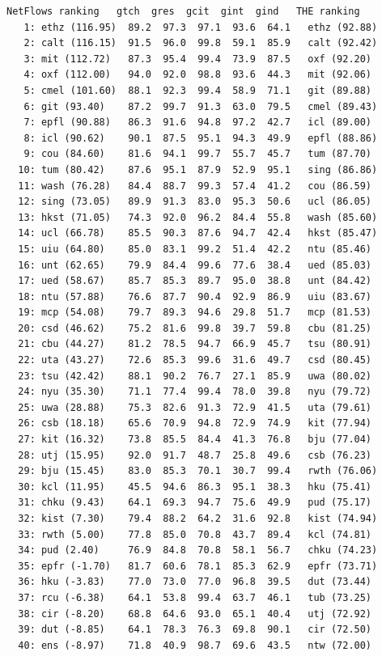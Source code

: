\begin{lstlisting}[caption={Comparing the robust \NetFlows ranking with the THE ranking},label=list:13.10]
  NetFlows ranking   gtch  gres  gcit  gint  gind   THE ranking
   1: ethz (116.95)  89.2  97.3  97.1  93.6  64.1   ethz (92.88)
   2: calt (116.15)  91.5  96.0  99.8  59.1  85.9   calt (92.42)
   3: mit (112.72)   87.3  95.4  99.4  73.9  87.5   oxf (92.20)
   4: oxf (112.00)   94.0  92.0  98.8  93.6  44.3   mit (92.06)
   5: cmel (101.60)  88.1  92.3  99.4  58.9  71.1   git (89.88)
   6: git (93.40)    87.2  99.7  91.3  63.0  79.5   cmel (89.43)
   7: epfl (90.88)   86.3  91.6  94.8  97.2  42.7   icl (89.00)
   8: icl (90.62)    90.1  87.5  95.1  94.3  49.9   epfl (88.86)
   9: cou (84.60)    81.6  94.1  99.7  55.7  45.7   tum (87.70)
  10: tum (80.42)    87.6  95.1  87.9  52.9  95.1   sing (86.86)
  11: wash (76.28)   84.4  88.7  99.3  57.4  41.2   cou (86.59)
  12: sing (73.05)   89.9  91.3  83.0  95.3  50.6   ucl (86.05)
  13: hkst (71.05)   74.3  92.0  96.2  84.4  55.8   wash (85.60)
  14: ucl (66.78)    85.5  90.3  87.6  94.7  42.4   hkst (85.47)
  15: uiu (64.80)    85.0  83.1  99.2  51.4  42.2   ntu (85.46)
  16: unt (62.65)    79.9  84.4  99.6  77.6  38.4   ued (85.03)
  17: ued (58.67)    85.7  85.3  89.7  95.0  38.8   unt (84.42)
  18: ntu (57.88)    76.6  87.7  90.4  92.9  86.9   uiu (83.67)
  19: mcp (54.08)    79.7  89.3  94.6  29.8  51.7   mcp (81.53)
  20: csd (46.62)    75.2  81.6  99.8  39.7  59.8   cbu (81.25)
  21: cbu (44.27)    81.2  78.5  94.7  66.9  45.7   tsu (80.91)
  22: uta (43.27)    72.6  85.3  99.6  31.6  49.7   csd (80.45)
  23: tsu (42.42)    88.1  90.2  76.7  27.1  85.9   uwa (80.02)
  24: nyu (35.30)    71.1  77.4  99.4  78.0  39.8   nyu (79.72)
  25: uwa (28.88)    75.3  82.6  91.3  72.9  41.5   uta (79.61)
  26: csb (18.18)    65.6  70.9  94.8  72.9  74.9   kit (77.94)
  27: kit (16.32)    73.8  85.5  84.4  41.3  76.8   bju (77.04)
  28: utj (15.95)    92.0  91.7  48.7  25.8  49.6   csb (76.23)
  29: bju (15.45)    83.0  85.3  70.1  30.7  99.4   rwth (76.06)
  30: kcl (11.95)    45.5  94.6  86.3  95.1  38.3   hku (75.41)
  31: chku (9.43)    64.1  69.3  94.7  75.6  49.9   pud (75.17)
  32: kist (7.30)    79.4  88.2  64.2  31.6  92.8   kist (74.94)
  33: rwth (5.00)    77.8  85.0  70.8  43.7  89.4   kcl (74.81)
  34: pud (2.40)     76.9  84.8  70.8  58.1  56.7   chku (74.23)
  35: epfr (-1.70)   81.7  60.6  78.1  85.3  62.9   epfr (73.71)
  36: hku (-3.83)    77.0  73.0  77.0  96.8  39.5   dut (73.44)
  37: rcu (-6.38)    64.1  53.8  99.4  63.7  46.1   tub (73.25)
  38: cir (-8.20)    68.8  64.6  93.0  65.1  40.4   utj (72.92)
  39: dut (-8.85)    64.1  78.3  76.3  69.8  90.1   cir (72.50)
  40: ens (-8.97)    71.8  40.9  98.7  69.6  43.5   ntw (72.00)

\end{lstlisting}
